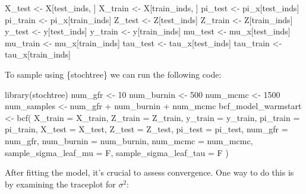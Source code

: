 \documentclass[
  letterpaper,
  DIV=11,
  numbers=noendperiod]{scrreprt}
\newenvironment{Shaded}{\begin{snugshade}}{\end{snugshade}}
\newcommand{\AttributeTok}[1]{\textcolor[rgb]{0.40,0.45,0.13}{#1}}
\newcommand{\DecValTok}[1]{\textcolor[rgb]{0.68,0.00,0.00}{#1}}
\newcommand{\FunctionTok}[1]{\textcolor[rgb]{0.28,0.35,0.67}{#1}}
\newcommand{\NormalTok}[1]{\textcolor[rgb]{0.00,0.23,0.31}{#1}}
\newcommand{\OtherTok}[1]{\textcolor[rgb]{0.00,0.23,0.31}{#1}}
\newcommand{\SpecialCharTok}[1]{\textcolor[rgb]{0.37,0.37,0.37}{#1}}
\begin{document}
\begin{Shaded}
\begin{Highlighting}[]
\NormalTok{X\_test }\OtherTok{\textless{}{-}}\NormalTok{ X[test\_inds, ]}
\NormalTok{X\_train }\OtherTok{\textless{}{-}}\NormalTok{ X[train\_inds, ]}
\NormalTok{pi\_test }\OtherTok{\textless{}{-}}\NormalTok{ pi\_x[test\_inds]}
\NormalTok{pi\_train }\OtherTok{\textless{}{-}}\NormalTok{ pi\_x[train\_inds]}
\NormalTok{Z\_test }\OtherTok{\textless{}{-}}\NormalTok{ Z[test\_inds]}
\NormalTok{Z\_train }\OtherTok{\textless{}{-}}\NormalTok{ Z[train\_inds]}
\NormalTok{y\_test }\OtherTok{\textless{}{-}}\NormalTok{ y[test\_inds]}
\NormalTok{y\_train }\OtherTok{\textless{}{-}}\NormalTok{ y[train\_inds]}
\NormalTok{mu\_test }\OtherTok{\textless{}{-}}\NormalTok{ mu\_x[test\_inds]}
\NormalTok{mu\_train }\OtherTok{\textless{}{-}}\NormalTok{ mu\_x[train\_inds]}
\NormalTok{tau\_test }\OtherTok{\textless{}{-}}\NormalTok{ tau\_x[test\_inds]}
\NormalTok{tau\_train }\OtherTok{\textless{}{-}}\NormalTok{ tau\_x[train\_inds]}
\end{Highlighting}
\end{Shaded}

To sample using \{stochtree\} we can run the following code:

\begin{Shaded}
\begin{Highlighting}[]
\FunctionTok{library}\NormalTok{(stochtree)}
\NormalTok{num\_gfr }\OtherTok{\textless{}{-}} \DecValTok{10}
\NormalTok{num\_burnin }\OtherTok{\textless{}{-}} \DecValTok{500}
\NormalTok{num\_mcmc }\OtherTok{\textless{}{-}} \DecValTok{1500}
\NormalTok{num\_samples }\OtherTok{\textless{}{-}}\NormalTok{ num\_gfr }\SpecialCharTok{+}\NormalTok{ num\_burnin }\SpecialCharTok{+}\NormalTok{ num\_mcmc}
\NormalTok{bcf\_model\_warmstart }\OtherTok{\textless{}{-}} \FunctionTok{bcf}\NormalTok{(}
  \AttributeTok{X\_train =}\NormalTok{ X\_train,}
  \AttributeTok{Z\_train =}\NormalTok{ Z\_train,}
  \AttributeTok{y\_train =}\NormalTok{ y\_train,}
  \AttributeTok{pi\_train =}\NormalTok{ pi\_train,}
  \AttributeTok{X\_test =}\NormalTok{ X\_test,}
  \AttributeTok{Z\_test =}\NormalTok{ Z\_test,}
  \AttributeTok{pi\_test =}\NormalTok{ pi\_test,}
  \AttributeTok{num\_gfr =}\NormalTok{ num\_gfr,}
  \AttributeTok{num\_burnin =}\NormalTok{ num\_burnin,}
  \AttributeTok{num\_mcmc =}\NormalTok{ num\_mcmc,}
  \AttributeTok{sample\_sigma\_leaf\_mu =}\NormalTok{ F,}
  \AttributeTok{sample\_sigma\_leaf\_tau =}\NormalTok{ F}
\NormalTok{)}
\end{Highlighting}
\end{Shaded}

After fitting the model, it's crucial to assess convergence. One way to
do this is by examining the traceplot for \(\sigma^2\):
\end{document}
